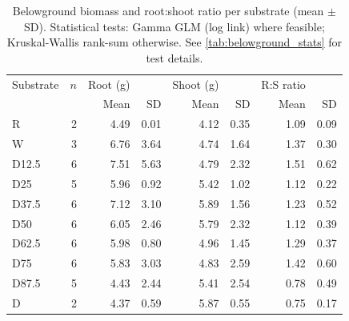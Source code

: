 \begin{table}[htbp]
\centering
\caption{Belowground biomass and root:shoot ratio per substrate (mean $\pm$ SD). Statistical tests: Gamma GLM (log link) where feasible; Kruskal-Wallis rank-sum otherwise. See \cref{tab:belowground_stats} for test details.}
\label{tab:belowground_summary}
\small
\begin{tabular}{l r rr rr rr}
\toprule
Substrate & $n$ & Root (g) & & Shoot (g) & & R:S ratio & \\
          &     & Mean & SD & Mean & SD & Mean & SD \\
\midrule
R        & 2 & 4.49 & 0.01 & 4.12 & 0.35 & 1.09 & 0.09 \\
W        & 3 & 6.76 & 3.64 & 4.74 & 1.64 & 1.37 & 0.30 \\
D12.5    & 6 & 7.51 & 5.63 & 4.79 & 2.32 & 1.51 & 0.62 \\
D25      & 5 & 5.96 & 0.92 & 5.42 & 1.02 & 1.12 & 0.22 \\
D37.5    & 6 & 7.12 & 3.10 & 5.89 & 1.56 & 1.23 & 0.52 \\
D50      & 6 & 6.05 & 2.46 & 5.79 & 2.32 & 1.12 & 0.39 \\
D62.5    & 6 & 5.98 & 0.80 & 4.96 & 1.45 & 1.29 & 0.37 \\
D75      & 6 & 5.83 & 3.03 & 4.83 & 2.59 & 1.42 & 0.60 \\
D87.5    & 5 & 4.43 & 2.44 & 5.41 & 2.54 & 0.78 & 0.49 \\
D        & 2 & 4.37 & 0.59 & 5.87 & 0.55 & 0.75 & 0.17 \\
\bottomrule
\end{tabular}
\end{table}
